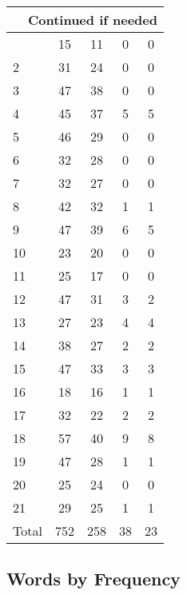 \begin{center}
\begin{longtable}{l|c|c|c|c}
\hline \multicolumn{5}{|r|}{{Continued if needed}} \\ \hline
\endfoot 
1 & 15 & 11 & 0 & 0\\ \hline
2 & 31 & 24 & 0 & 0\\ \hline
3 & 47 & 38 & 0 & 0\\ \hline
4 & 45 & 37 & 5 & 5\\ \hline
5 & 46 & 29 & 0 & 0\\ \hline
6 & 32 & 28 & 0 & 0\\ \hline
7 & 32 & 27 & 0 & 0\\ \hline
8 & 42 & 32 & 1 & 1\\ \hline
9 & 47 & 39 & 6 & 5\\ \hline
10 & 23 & 20 & 0 & 0\\ \hline
11 & 25 & 17 & 0 & 0\\ \hline
12 & 47 & 31 & 3 & 2\\ \hline
13 & 27 & 23 & 4 & 4\\ \hline
14 & 38 & 27 & 2 & 2\\ \hline
15 & 47 & 33 & 3 & 3\\ \hline
16 & 18 & 16 & 1 & 1\\ \hline
17 & 32 & 22 & 2 & 2\\ \hline
18 & 57 & 40 & 9 & 8\\ \hline
19 & 47 & 28 & 1 & 1\\ \hline
20 & 25 & 24 & 0 & 0\\ \hline
21 & 29 & 25 & 1 & 1\\ \hline
\hline \hline
Total & 752 & 258 & 38 & 23



\end{longtable}
\end{center}

 
\subsection{Words by Frequency}

